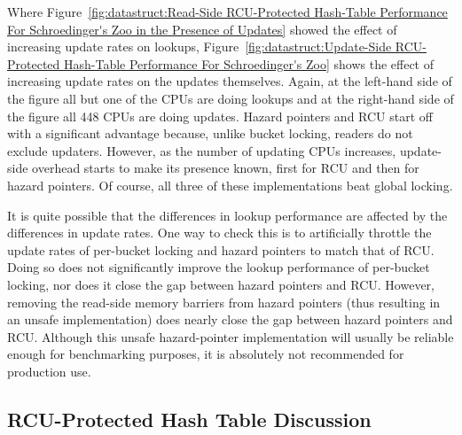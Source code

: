 Where
Figure~\ref{fig:datastruct:Read-Side RCU-Protected Hash-Table Performance For Schroedinger's Zoo in the Presence of Updates}
showed the effect of increasing update rates on lookups,
Figure~\ref{fig:datastruct:Update-Side RCU-Protected Hash-Table Performance For Schroedinger's Zoo}
shows the effect of increasing update rates on the updates themselves.
Again, at the left-hand side of the figure all but one of the CPUs are
doing lookups and at the right-hand side of the figure all 448 CPUs are
doing updates.
Hazard pointers and RCU start off with a significant advantage because,
unlike bucket locking, readers do not exclude updaters.
However, as the number of updating CPUs increases, update-side overhead
starts to make its presence known, first for RCU and then for hazard
pointers.
Of course, all three of these implementations beat global locking.

It is quite possible that the differences in lookup performance
are affected by the differences in update rates.
One way to check this is to artificially throttle the update rates of
per-bucket locking and hazard pointers to match that of RCU\@.
Doing so does not significantly improve the lookup performance of
per-bucket locking, nor does it close the gap between hazard pointers
and RCU\@.
However, removing the read-side memory barriers from hazard pointers
(thus resulting in an unsafe implementation) does nearly close the gap
between hazard pointers and RCU\@.
Although this unsafe hazard-pointer implementation will
usually be reliable enough for benchmarking purposes, it is absolutely
not recommended for production use.

\QuickQuizEnd

\subsection{RCU-Protected Hash Table Discussion}
\label{sec:datastruct:RCU-Protected Hash Table Discussion}

